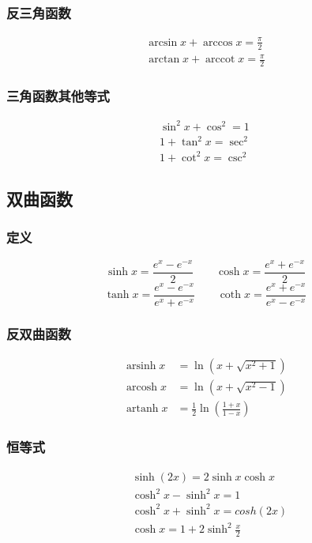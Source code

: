 \subsubsection{反三角函数}
\begin{align}
    \arcsin x+\arccos x =\frac{\pi}{2}\\
    \arctan x+\operatorname{arccot}{x} =\frac{\pi}{2}
\end{align}
\subsubsection{三角函数其他等式}
\begin{align}
    \sin^2 x+\cos^2 =1\\
    1+\tan^2 x = \sec^2\\
    1+\cot^2 x = \csc^2
\end{align}
\subsection{双曲函数}
\subsubsection{定义}
$$\sinh x = \frac{e^x-e^{-x}}{2}\qquad \cosh x = \frac{e^x+e^{-x}}{2}$$
$$\tanh x = \frac{e^x-e^{-x}}{e^x+e^{-x}}\qquad \coth x = \frac{e^x+e^{-x}}{e^x-e^{-x}}$$
\subsubsection{反双曲函数}
\begin{align}
    \operatorname{arsinh}{x}&=\ln(x+\sqrt{x^2+1})\\
    \operatorname{arcosh}{x}&=\ln(x+\sqrt{x^2-1})\\
    \operatorname{artanh}{x}&=\frac{1}{2}\ln(\frac{1+x}{1-x})
\end{align}

\subsubsection{恒等式}
\begin{align}
&\sinh (2x) = 2\sinh x\cosh x \label{eq:hyperbolic_functions_1} \\
&\cosh^2x-\sinh^2x = 1 \label{eq:hyperbolic_functions_2} \\
&\cosh^2x+\sinh^2x = cosh (2x) \label{eq:hyperbolic_functions_3} \\
&\cosh x = 1+2\sinh^2\frac{x}{2} \label{eq:hyperbolic_functions_4}
\end{align}
